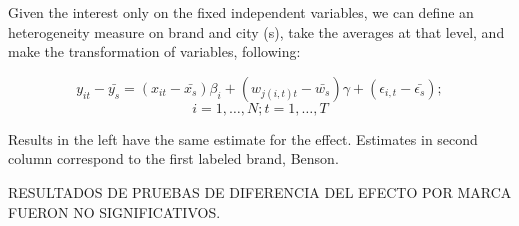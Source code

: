 \documentclass[]{article}
\begin{document}
Given the interest only on the fixed independent variables, we can define an heterogeneity measure on brand and city (s), take the averages at that level, and make the transformation of variables, following:
 
\begin{equation*}
y_{it} - \bar{y_s} = (x_{it} - \bar{x_{s}}) \beta_{i} + (w_{j(i,t)t}-\bar{w_{s}}) \gamma + (\epsilon_{i,t} - \bar{\epsilon_{s}}); 
\end{equation*}
$$i = 1,\ldots,N; t=1,\ldots,T$$
 
Results in the left have the same estimate for the effect. Estimates in second column correspond to the first labeled brand, Benson.
 


RESULTADOS DE PRUEBAS DE DIFERENCIA DEL EFECTO POR MARCA FUERON NO SIGNIFICATIVOS.
\end{document}
